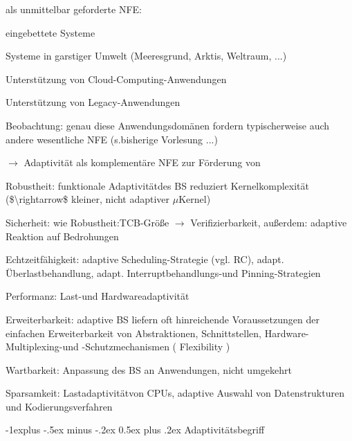 \documentclass[a4paper]{article}
\makeatletter
\renewcommand{\subsection}{\@startsection{subsection}{2}{0mm}%
 {-1explus -.5ex minus -.2ex}%
 {0.5ex plus .2ex}%
 {\normalfont\normalsize\bfseries}}
\makeatother
\begin{document}
\begin{multicols}{3}
    \begin{itemize*}
        \item
        als unmittelbar geforderte NFE:
        \begin{itemize*}
            \item eingebettete Systeme
            \item Systeme in garstiger Umwelt (Meeresgrund, Arktis, Weltraum, ...)
            \item Unterstützung von Cloud-Computing-Anwendungen
            \item Unterstützung von Legacy-Anwendungen
        \end{itemize*}
        \item
        Beobachtung: genau diese Anwendungsdomänen fordern typischerweise auch
        andere wesentliche NFE (s.bisherige Vorlesung ...)
        \item
        $\rightarrow$  Adaptivität als komplementäre NFE zur
        Förderung von
        \begin{itemize*}
            \item Robustheit: funktionale Adaptivitätdes BS reduziert Kernelkomplexität (\$\textbackslash rightarrow\$ kleiner, nicht adaptiver $\mu$Kernel)
            \item Sicherheit: wie Robustheit:TCB-Größe $\rightarrow$  Verifizierbarkeit, außerdem: adaptive Reaktion auf Bedrohungen
            \item Echtzeitfähigkeit: adaptive Scheduling-Strategie (vgl. RC), adapt. Überlastbehandlung, adapt. Interruptbehandlungs-und Pinning-Strategien
            \item Performanz: Last-und Hardwareadaptivität
            \item Erweiterbarkeit: adaptive BS liefern oft hinreichende Voraussetzungen der einfachen Erweiterbarkeit von Abstraktionen, Schnittstellen, Hardware-Multiplexing-und -Schutzmechanismen ( Flexibility )
            \item Wartbarkeit: Anpassung des BS an Anwendungen, nicht umgekehrt
            \item Sparsamkeit: Lastadaptivitätvon CPUs, adaptive Auswahl von Datenstrukturen und Kodierungsverfahren
        \end{itemize*}
    \end{itemize*}


    \subsection{Adaptivitätsbegriff}


\end{multicols}
\end{document}
